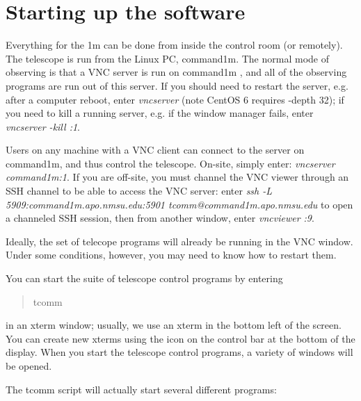 \documentclass[10pt]{report}
\begin{document}
\section{Starting up the software}

\label{sect:software}

Everything for the 1m can be done from inside the control room (or remotely).
The telescope is run from the Linux PC, command1m. 
The normal mode of observing is that a VNC server is run on command1m , and
all of the observing programs are run out of this server.  If you should need
to restart the server, e.g. after a computer reboot, enter \textit{vncserver} (note CentOS 6 requires -depth 32);
if you need to kill a running server, e.g. if the window manager fails,
enter \textit{vncserver -kill :1}.

Users on any machine with a VNC client can connect to the server on command1m, 
and thus control the telescope. On-site, simply enter: \textit{vncserver command1m:1}. If you are off-site, you must channel the
VNC viewer through an SSH channel to be able to access the VNC server:
enter \textit{ssh -L 5909:command1m.apo.nmsu.edu:5901 tcomm@command1m.apo.nmsu.edu} to open a channeled SSH session, then from another window, enter
\textit{vncviewer :9}.

Ideally, the set of telecope programs will already be running in the VNC
window. Under some conditions, however, you may need to know how to restart them.

You can start the suite of telescope control programs by entering
\begin{quote} tcomm \end{quote} in an xterm window; usually, we use
an xterm in the bottom left of the screen.
You can create new xterms using the icon on the control bar
at the bottom of the display.
When you start the telescope control programs, a variety of windows will
be opened.

The tcomm script  will actually start several different programs:
\end{document}
